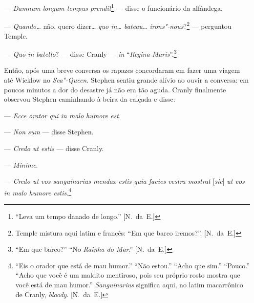 --- \textit{Damnum longum tempus prendit}\footnote{ ``Leva um tempo danado de longo.'' [N.~da~E.]}
--- disse o funcionário da alfândega.

--- \textit{Quando\ldots{}} não, quero dizer\ldots{} \textit{quo in\ldots{}  bateau\ldots{}    
irons"-nous}?\footnote{ Temple mistura aqui latim e francês: ``Em que barco iremos?''. [N.~da~E.]} --- perguntou Temple.

--- \textit{Quo in batello}? --- disse Cranly --- \textit{in} “\textit{Regina                    
Maris}”.\footnote{ ``Em que barco?'' ``No \emph{Rainha do Mar}.'' [N.~da~E.]}

Então, após uma breve conversa os rapazes concordaram em fazer uma viagem até
Wicklow no \textit{Sea"-Queen}.  Stephen sentiu grande alívio ao ouvir a
conversa: em poucos minutos a dor do \label{desastre"-ja} desastre já não era tão aguda.  Cranly
finalmente observou Stephen caminhando à beira da calçada e disse:

--- \textit{Ecce orator qui in malo humore est.}                                               

--- \textit{Non sum} --- disse Stephen.                                                          

--- \textit{Credo ut estis} --- disse Cranly.                                                  

--- \textit{Minime}.

--- \textit{Credo ut vos sanguinarius mendax estis quia facies vestra mostrat}
[\textit{sic}] \textit{ut vos in malo humore estis}.\footnote{ ``Eis o orador que está de mau humor.'' 
``Não estou.'' ``Acho que sim.'' ``Pouco.'' ``Acho que você é um maldito mentiroso, pois seu 
próprio rosto mostra que você está de mau humor.'' \emph{Sanguinarius} significa aqui, no latim
macarrônico de Cranly, \emph{bloody}. [N.~da~E.]}


